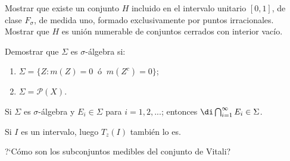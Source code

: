 \documentclass{book}
\begin{document}
   \begin{ejer}{} 
	Mostrar que existe un conjunto $H$ incluido en el intervalo unitario $[0,1]$, de clase
  $F_{\sigma}$, de medida uno, formado exclusivamente por puntos irracionales. 
  \\
  Mostrar que $H$ es unión numerable de conjuntos cerrados con interior vacío.
\end{ejer} 

   \begin{ejer}{} 
	Demostrar que $\Sigma$ es $\sigma$-álgebra si:
	\begin{enumerate}
    \item $\Sigma=\{Z:m(Z)=0 \;\;\text{ó}\;\; m(Z^c)=0\}$;
    \item $\Sigma=\mathcal{P}(X)$.
	\end{enumerate}
	\end{ejer} 

   \begin{ejer}{} 
	Si $\Sigma$ es $\sigma$-álgebra y $E_i \in  \Sigma$ para $i=1,2,...$; entonces\;
  $\di\bigcap_{i=1}^{\infty} E_i \in \Sigma$.
	\end{ejer} 

   \begin{ejer}{} 
	Si $I$ es un intervalo, luego $T_z(I)$ también lo es.
	\end{ejer} 
  
   \begin{ejer}{} 
	?`Cómo son los subconjuntos medibles del conjunto de Vitali?
\end{ejer} 
\end{document}
